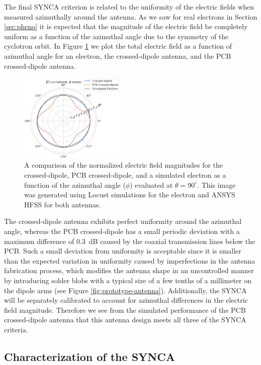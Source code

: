 The final SYNCA criterion is related to the uniformity of the electric fields when measured azimuthally around the antenna. As we saw for real electrons in Section \ref{sec:pheno} it is expected that the magnitude of the electric field be completely uniform as a function of the azimuthal angle due to the symmetry of the cyclotron orbit. In Figure \ref{fig:field-comparison-phi} we plot the total electric field as a function of azimuthal angle for an electron, the crossed-dipole antenna, and the PCB crossed-dipole antenna. 
\begin{figure}[h]
    \centering
    \includegraphics[width=0.45\textwidth]{figs/Chapter-5/221109_field_mag_comparison_phi_only.png}
    \caption{A comparison of the normalized electric field magnitudes for the crossed-dipole, PCB crossed-dipole, and a simulated electron as a function of the azimuthal angle ($\phi$) evaluated at $\theta=90^\circ$. This image was generated using Locust simulations for the electron and ANSYS HFSS for both antennas.}
    \label{fig:field-comparison-phi}
\end{figure}
The crossed-dipole antenna exhibits perfect uniformity around the azimuthal angle, whereas the PCB crossed-dipole has a small periodic deviation with a maximum difference of 0.3~dB caused by the coaxial transmission lines below the PCB. Such a small deviation from uniformity is acceptable since it is smaller than the expected variation in uniformity caused by imperfections in the antenna fabrication process, which modifies the antenna shape in an uncontrolled manner by introducing solder blobs with a typical size of a few tenths of a millimeter on the dipole arms (see Figure \ref{fig:prototype-antenna}). Additionally, the SYNCA will be separately calibrated to account for azimuthal differences in the electric field magnitude. Therefore we see from the simulated performance of the PCB crossed-dipole antenna that this antenna design meets all three of the SYNCA criteria.

\subsection{Characterization of the SYNCA}
\label{sec:synca-characterization-meas}

